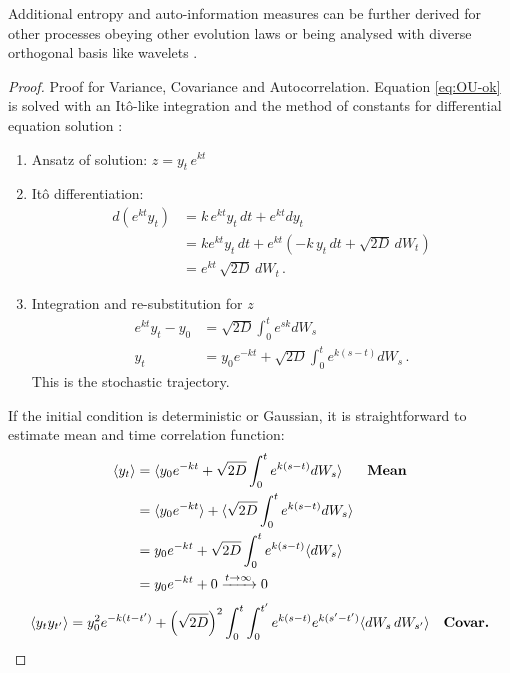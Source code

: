 Additional entropy and auto-information measures can be further derived for other processes obeying other evolution laws \citep{Frank2004,Heseltine2016,Heseltine2019,Chapeau-Blondeau2007} or being analysed with diverse orthogonal basis like wavelets \citep{Coifman1992,Kirby2005,Abdel-Hamid2016}.

\begin{proof}
	Proof for Variance, Covariance and Autocorrelation. Equation \ref{eq:OU-ok} is solved with an Itô-like integration and the method of constants for differential equation solution :
	\begin{enumerate}
		\item Ansatz of solution: $z = y_t \, e^{kt}$
		\item Itô differentiation: 
		\begin{align*} 
			d \left( e^{kt} y_t \right) &= k \, e^{kt} y_t \, dt + e^{kt} dy_t \\ 
			&= ke^{kt} y_t \, dt + e^{kt} \left( -k \, y_t \, dt + \sqrt{2D} \, dW_t \right)	\\
			&= e^{kt} \, \sqrt{2D} \, dW_t \, .
		\end{align*}
		\item Integration and re-substitution for $z$
		\begin{equation} \label{eq1}
			\begin{split}
				e^{kt} y_t - y_0 & = \sqrt{2D} \int^t_0 e^{sk} dW_s \\
				y_t & = y_0 e^{-kt} + \sqrt{2D} \int_{0}^{t} e^{k(s-t)} dW_s \, .
			\end{split}
		\end{equation}
		This is the stochastic trajectory.
	\end{enumerate}
	If the initial condition is deterministic or Gaussian, it is straightforward to estimate mean and time correlation function:
	\begin{align*}
		\langle y_t \rangle &= \langle y_0 e^{-kt} + \sqrt{2D} \int_{0}^{t} e^{k(s-t)} dW_s \rangle && \text{\textbf{Mean}}\\
		&= \langle y_0 e^{-kt}  \rangle + \langle  \sqrt{2D} \int_{0}^{t} e^{k(s-t)} dW_s \rangle \\
		&= y_0 e^{-kt} + \sqrt{2D} \int_{0}^{t} e^{k(s-t)} \langle dW_s \rangle \\
		&= y_0 e^{-kt} + 0 \xrightarrow[]{t \to \infty} 0
	\end{align*}
	\begin{align*}
		\langle y_t y_{t'} \rangle &= y_0^2 e^{-k(t-t')} + \left( \sqrt{2D} \right) ^2 \int_{0}^{t} \int_{0}^{t'} e^{k(s-t)} e^{k(s'-t')} \langle dW_s \, dW_{s'} \rangle && \text{\textbf{Covar.}}\\

\end{align*}
\end{proof}
